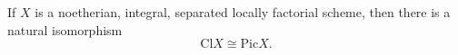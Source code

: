 If $X$ is a noetherian, integral, separated locally factorial scheme, then there is a natural isomorphism
$$\text{Cl} X \cong \text{Pic} X.$$
